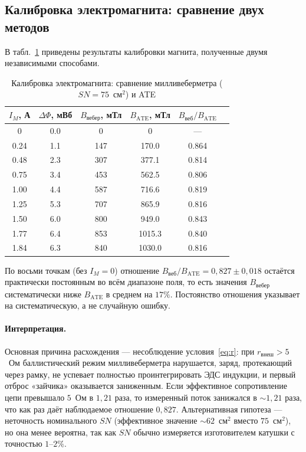 \documentclass[a4paper,12pt]{article}
\begin{document}
\subsection{Калибровка электромагнита: сравнение двух методов}
В табл.~\ref{tab:calib} приведены результаты калибровки магнита, полученные двумя независимыми способами.

\begin{table}[H]
    \centering
    \caption{Калибровка электромагнита: сравнение милливеберметра ($SN = 75$~см$^2$) и ATE}
    \label{tab:calib}
    \begin{tabular}{cccccc}
        \toprule
        $I_M$, А & $\Delta\Phi$, мВб & $B_{\text{вебер}}$, мТл & $B_{\text{ATE}}$, мТл & $B_\text{веб}/B_\text{ATE}$ \\
        \midrule
        0    & 0.0 & 0    & 0    & --- \\
        0.24 & 1.1 & 147  & 170.0 & 0.864 \\
        0.48 & 2.3 & 307  & 377.1 & 0.814 \\
        0.75 & 3.4 & 453  & 562.5 & 0.806 \\
        1.00 & 4.4 & 587  & 716.6 & 0.819 \\
        1.25 & 5.3 & 707  & 865.9 & 0.816 \\
        1.50 & 6.0 & 800  & 949.0 & 0.843 \\
        1.77 & 6.4 & 853  & 1015.3 & 0.840 \\
        1.84 & 6.3 & 840  & 1030.0 & 0.816 \\
        \bottomrule
    \end{tabular}
\end{table}

По восьми точкам (без $I_M=0$) отношение \(B_\text{веб}/B_\text{ATE} = 0{,}827 \pm 0{,}018\) остаётся практически постоянным во всём диапазоне поля, то есть значения \(B_\text{вебер}\) систематически ниже \(B_\text{ATE}\) в среднем на \(17\%\). Постоянство отношения указывает на систематическую, а не случайную ошибку.

\paragraph{Интерпретация.} Основная причина расхождения --- несоблюдение условия~\eqref{eq:r}: при \(r_\text{внеш} > 5\)~Ом баллистический режим милливеберметра нарушается, заряд, протекающий через рамку, не успевает полностью проинтегрировать ЭДС индукции, и первый отброс «зайчика» оказывается заниженным. Если эффективное сопротивление цепи превышало \(5\)~Ом в \(1{,}21\) раза, то измеренный поток занижался в \(\sim1{,}21\) раза, что как раз даёт наблюдаемое отношение \(0{,}827\). Альтернативная гипотеза --- неточность номинального \(SN\) (эффективное значение \(\sim 62\)~см$^2$ вместо \(75\)~см$^2$), но она менее вероятна, так как \(SN\) обычно измеряется изготовителем катушки с точностью \(1\text{--}2\%\).
\end{document}
